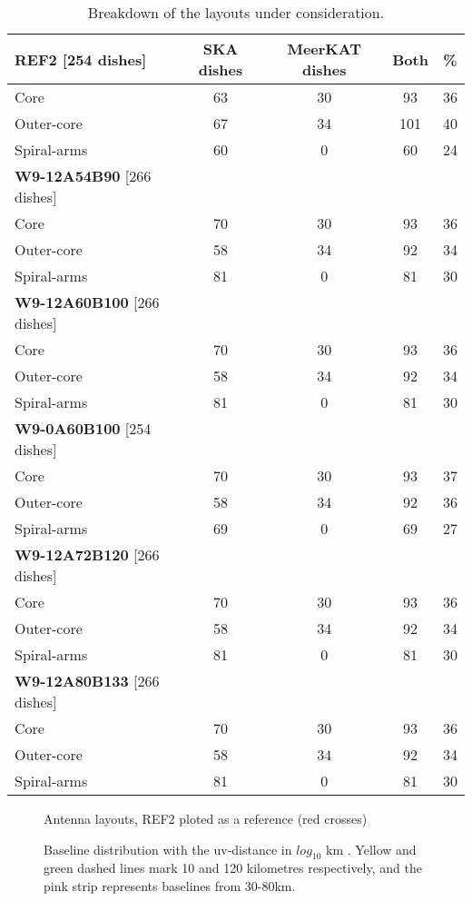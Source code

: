 \documentclass[sfheadings,a4paper,10pt,floats,floatfix]{article}
\begin{document}
\begin{table}[H]
\centering
 \tiny{
 \begin{tabular}{l|cccc}\hline
 {\bf REF2} [254 dishes] & SKA dishes&  MeerKAT dishes & Both & \% \\\hline\hline
  Core & 63 & 30 & 93 & 36 \\
 Outer-core & 67 & 34 & 101 & 40 \\
 Spiral-arms & 60 & 0 & 60 & 24 \\\hline\hline
  {\bf W9-12A54B90} [266 dishes] &  & &  & \\\hline\hline
  Core & 70 & 30 & 93 & 36 \\
 Outer-core & 58 & 34 & 92 & 34 \\
 Spiral-arms & 81 & 0 & 81 & 30 \\\hline\hline
  {\bf W9-12A60B100} [266 dishes] &  & &  & \\\hline\hline
  Core & 70 & 30 & 93 & 36 \\
 Outer-core & 58 & 34 & 92 & 34 \\
 Spiral-arms & 81 & 0 & 81 & 30 \\\hline\hline
 {\bf W9-0A60B100} [254 dishes] &  & &  & \\\hline\hline
  Core & 70 & 30 & 93 & 37 \\
 Outer-core & 58 & 34 & 92 & 36 \\
 Spiral-arms & 69 & 0 & 69 & 27 \\\hline\hline
  {\bf W9-12A72B120} [266 dishes] &  & &  & \\\hline\hline
  Core & 70 & 30 & 93 & 36 \\
 Outer-core & 58 & 34 & 92 & 34 \\
 Spiral-arms & 81 & 0 & 81 & 30 \\\hline\hline
   {\bf W9-12A80B133} [266 dishes] &  & &  & \\\hline\hline
  Core & 70 & 30 & 93 & 36 \\
 Outer-core & 58 & 34 & 92 & 34 \\
 Spiral-arms & 81 & 0 & 81 & 30 \\\hline
 \end{tabular}}
 \caption{Breakdown of the layouts under consideration.}\label{tab:lay}
\end{table}

\begin{figure}[H]
 \tiny{}
 \caption{Antenna layouts, REF2 ploted as a reference (red crosses)}\label{fig:lay}
\end{figure}
\begin{figure}[H]
 \tiny{}
 \caption{Baseline distribution with the uv-distance in $log_{10}$ km . Yellow and green dashed lines mark 10 and 120
kilometres respectively, and the pink strip represents baselines from 30-80km.}\label{fig:hist}
\end{figure}
\end{document}
